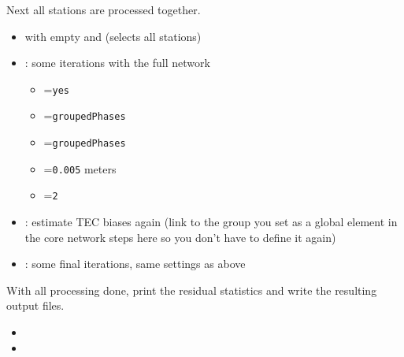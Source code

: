 Next all stations are processed together.
\begin{itemize}
  \item {} with empty
         and 
        (selects all stations)
  \item {}: some iterations with the full network
  \begin{itemize}
    \item {}=\verb|yes|
    \item {}=\verb|groupedPhases|
    \item {}=\verb|groupedPhases|
    \item {}=\verb|0.005| meters
    \item {}=\verb|2|
  \end{itemize}
  \item {}: estimate TEC biases again (link to the group
        you set as a global element in the core network steps here so you don't have to define it again)
  \item {}: some final iterations, same settings as above
\end{itemize}

With all processing done, print the residual statistics and write the resulting output files.
\begin{itemize}
  \item {}
  \item {}
\end{itemize}

